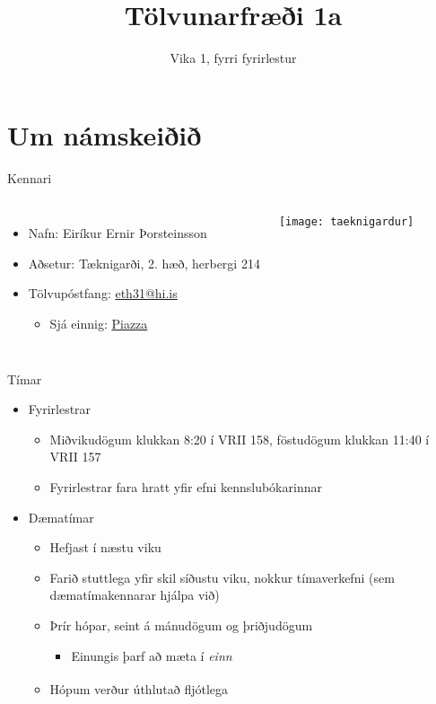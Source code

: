 \documentclass[handout]{beamer}
\title{Tölvunarfræði 1a}
\subtitle{Vika 1, fyrri fyrirlestur}
\begin{document}
\begin{frame}
\titlepage
\end{frame}

\section{Um námskeiðið}

\begin{frame}{Kennari}
\begin{columns}
\begin{itemize}
 \item Nafn: Eiríkur Ernir Þorsteinsson
 \item Aðsetur: Tæknigarði, 2. hæð, herbergi 214
 \item Tölvupóstfang: \href{mailto:eth31@hi.is}{eth31@hi.is}
 \begin{itemize}
  \item Sjá einnig: \hyperlink{frame:piazza}{Piazza}
 \end{itemize}
\end{itemize}
\texttt{[image: taeknigardur]}
\end{columns}
\end{frame}

\begin{frame}{Tímar}
\begin{itemize}
 \item Fyrirlestrar
 \begin{itemize}
  \item Miðvikudögum klukkan 8:20 í VRII 158, föstudögum klukkan 11:40 í VRII 157
  \item Fyrirlestrar fara hratt yfir efni kennslubókarinnar
 \end{itemize}
 \item Dæmatímar
 \begin{itemize}
  \item Hefjast í næstu viku
  \item Farið stuttlega yfir skil síðustu viku, nokkur tímaverkefni (sem dæmatímakennarar hjálpa við)
  \item Þrír hópar, seint á mánudögum og þriðjudögum
  \begin{itemize}
   \item Einungis þarf að mæta í \emph{einn}
  \end{itemize}
  \item Hópum verður úthlutað fljótlega\textsuperscript{\textregistered}
 \end{itemize}
\end{itemize} 
\end{frame}
\end{document}
